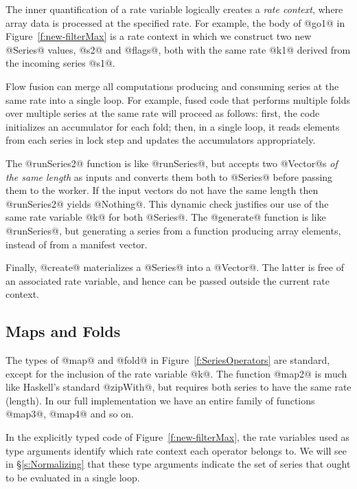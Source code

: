 The inner quantification of a rate variable logically creates a \emph{rate context}, where array data is processed at the specified rate. For example, the body of @go1@ in Figure~\ref{f:new-filterMax} is a rate context in which we construct two new @Series@ values, @s2@ and @flags@, both with the same rate @k1@ derived from the incoming series @s1@. 

Flow fusion can merge all computations producing and consuming series at the same rate into a single loop. For example, fused code that performs multiple folds over multiple series at the same rate will proceed as follows: first, the code initializes an accumulator for each fold; then, in a single loop, it reads elements from each series in lock step and updates the accumulators appropriately.

The @runSeries2@ function is like @runSeries@, but accepts two @Vector@s \emph{of the same length} as inputs and converts them both to @Series@ before passing them to the worker. If the input vectors do not have the same length then @runSeries2@ yields @Nothing@. This dynamic check justifies our use of the same rate variable @k@ for both @Series@. The @generate@ function is like @runSeries@, but generating a series from a function producing array elements, instead of from a manifest vector.

Finally, @create@ materializes a @Series@ into a @Vector@. The latter is free of an associated rate variable, and hence can be passed outside the current rate context.


\subsection{Maps and Folds}

The types of @map@ and @fold@ in Figure~\ref{f:SeriesOperators} are standard, except for the inclusion of the rate variable @k@. The function @map2@ is much like Haskell's standard @zipWith@, but requires both series to have the same rate (length). In our full implementation we have an entire family of functions @map3@, @map4@ and so on.

In the explicitly typed code of Figure~\ref{f:new-filterMax}, the rate variables used as type arguments identify which rate context each operator belongs to. We will see in \S\ref{s:Normalizing} that these type arguments indicate the set of series that ought to be evaluated in a single loop. 


